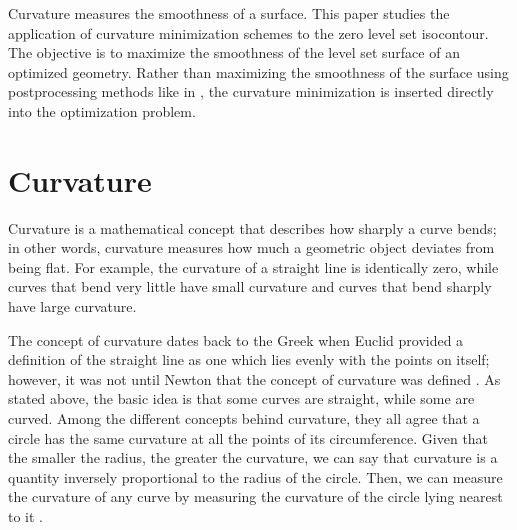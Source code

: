 

Curvature measures the smoothness of a surface. This paper studies the application of curvature minimization schemes to the zero level set isocontour. The objective is to maximize the smoothness of the level set surface of an optimized geometry. Rather than maximizing the smoothness of the surface using postprocessing methods like in \citep{LC:87}, the curvature minimization is inserted directly into the optimization problem.
% 
% 




\section{Curvature}
\label{sec:curvature_methods}

Curvature is a mathematical concept that describes how sharply a curve bends; in other words, curvature measures how much a geometric object deviates from being flat. For example, the curvature of a straight line is identically zero, while curves that bend very little have small curvature and curves that bend sharply have large curvature.

The concept of curvature dates back to the Greek when Euclid provided a definition of the straight line as one which lies evenly with the points on itself; however, it was not until Newton that the concept of curvature was defined \citep{NC:1736}. As stated above, the basic idea is that some curves are straight, while some are curved. Among the different concepts behind curvature, they all agree that a circle has the same curvature at all the points of its circumference. Given that the smaller the radius, the greater the curvature, we can say that curvature is a quantity inversely proportional to the radius of the circle. Then, we can measure the curvature of any curve by measuring the curvature of the circle lying nearest to it \citep{Coolidge:52}.

